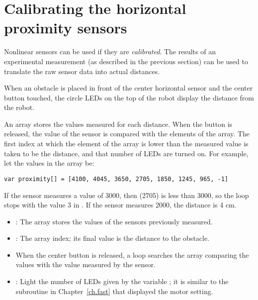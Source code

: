 \section{Calibrating the horizontal proximity sensors}

Nonlinear sensors can be used if they are \emph{calibrated}.
The results of an experimental measurement (as described in the previous
section) can be used to translate the raw sensor data into actual
distances.


When an obstacle is placed in front of the center horizontal sensor and
the center button touched, the circle LEDs on the top of the robot
display the distance from the robot.


An array stores the values measured for each distance. When the button
is released, the value of the sensor is compared with the elements of
the array. The first index at which the element of the array is lower
than the measured value is taken to be the distance, and that number of
LEDs are turned on. For example, let the values in the array be:

\begin{verbatim}
var proximity[] = [4100, 4045, 3650, 2705, 1850, 1245, 965, -1]
\end{verbatim} 

If the sensor measures a value of 3000, then  (2705) is
less than 3000, so the loop stops with the value 3 in .
If the sensor measures 2000, the distance is 4 cm.


\begin{itemize}

\item {}: The array stores the values of the sensors
previously measured.

\item {}: The array index; its final value is the distance to
the obstacle.

\end{itemize}


\begin{itemize}

\item When the center button is released, a loop searches the array
 comparing the values with the value measured by the
sensor.

\item {}: Light the number of LEDs given by the
variable ; it is similar to the subroutine in
Chapter~\ref{ch.fast} that displayed the motor setting.

\end{itemize}

